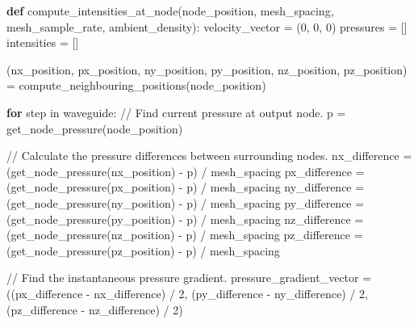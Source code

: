 \documentclass[]{scrreprt}
\newenvironment{Shaded}{}{}
\newcommand{\KeywordTok}[1]{\textcolor[rgb]{0.00,0.44,0.13}{\textbf{{#1}}}}
\newcommand{\DecValTok}[1]{\textcolor[rgb]{0.25,0.63,0.44}{{#1}}}
\newcommand{\ControlFlowTok}[1]{\textcolor[rgb]{0.00,0.44,0.13}{\textbf{{#1}}}}
\newcommand{\OperatorTok}[1]{\textcolor[rgb]{0.40,0.40,0.40}{{#1}}}
\newcommand{\NormalTok}[1]{{#1}}
\begin{document}
\begin{Shaded}
\begin{Highlighting}[]
\KeywordTok{def} \NormalTok{compute_intensities_at_node(node_position,}
                                \NormalTok{mesh_spacing,}
                                \NormalTok{mesh_sample_rate,}
                                \NormalTok{ambient_density):}
    \NormalTok{velocity_vector }\OperatorTok{=} \NormalTok{(}\DecValTok{0}\NormalTok{, }\DecValTok{0}\NormalTok{, }\DecValTok{0}\NormalTok{)}
    \NormalTok{pressures }\OperatorTok{=} \NormalTok{[]}
    \NormalTok{intensities }\OperatorTok{=} \NormalTok{[]}

    \NormalTok{(nx_position, px_position,}
     \NormalTok{ny_position, py_position,}
     \NormalTok{nz_position, pz_position) }\OperatorTok{=} \NormalTok{compute_neighbouring_positions(node_position)}

    \ControlFlowTok{for} \NormalTok{step }\OperatorTok{in} \NormalTok{waveguide:}
        \OperatorTok{//}  \NormalTok{Find current pressure at output node.}
        \NormalTok{p }\OperatorTok{=} \NormalTok{get_node_pressure(node_position)}

        \OperatorTok{//}  \NormalTok{Calculate the pressure differences between surrounding nodes.}
        \NormalTok{nx_difference }\OperatorTok{=} \NormalTok{(get_node_pressure(nx_position) }\OperatorTok{-} \NormalTok{p) }\OperatorTok{/} \NormalTok{mesh_spacing}
        \NormalTok{px_difference }\OperatorTok{=} \NormalTok{(get_node_pressure(px_position) }\OperatorTok{-} \NormalTok{p) }\OperatorTok{/} \NormalTok{mesh_spacing}
        \NormalTok{ny_difference }\OperatorTok{=} \NormalTok{(get_node_pressure(ny_position) }\OperatorTok{-} \NormalTok{p) }\OperatorTok{/} \NormalTok{mesh_spacing}
        \NormalTok{py_difference }\OperatorTok{=} \NormalTok{(get_node_pressure(py_position) }\OperatorTok{-} \NormalTok{p) }\OperatorTok{/} \NormalTok{mesh_spacing}
        \NormalTok{nz_difference }\OperatorTok{=} \NormalTok{(get_node_pressure(nz_position) }\OperatorTok{-} \NormalTok{p) }\OperatorTok{/} \NormalTok{mesh_spacing}
        \NormalTok{pz_difference }\OperatorTok{=} \NormalTok{(get_node_pressure(pz_position) }\OperatorTok{-} \NormalTok{p) }\OperatorTok{/} \NormalTok{mesh_spacing}

        \OperatorTok{//}  \NormalTok{Find the instantaneous pressure gradient.}
        \NormalTok{pressure_gradient_vector }\OperatorTok{=} \NormalTok{((px_difference }\OperatorTok{-} \NormalTok{nx_difference) }\OperatorTok{/} \DecValTok{2}\NormalTok{,}
                                    \NormalTok{(py_difference }\OperatorTok{-} \NormalTok{ny_difference) }\OperatorTok{/} \DecValTok{2}\NormalTok{,}
                                    \NormalTok{(pz_difference }\OperatorTok{-} \NormalTok{nz_difference) }\OperatorTok{/} \DecValTok{2}\NormalTok{)}


\end{Highlighting}
\end{Shaded}
\end{document}
